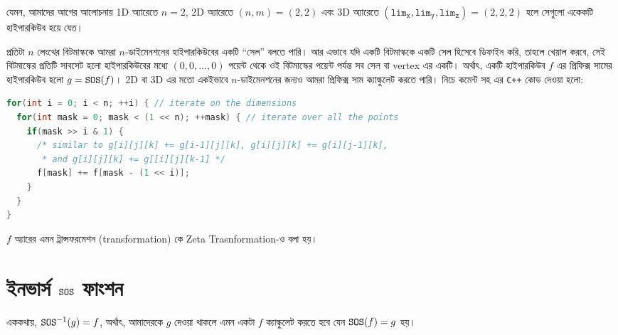 যেমন, আমাদের আগের আলোচনায় 1D অ্যারেতে $n=2$, 2D অ্যারেতে $(n,m) = (2,2)$ এবং
3D অ্যারেতে $(\mathtt{lim_x}, \mathtt{lim_y}, \mathtt{lim_z}) = (2,2,2)$ হলে
সেগুলো একেকটি হাইপারকিউব হয়ে যেত।

প্রতিটা $n$ লেংথের বিটমাস্ককে আমরা $n$-ডাইমেনশনের হাইপারকিউবের একটি ``সেল''
বলতে পারি। আর এভাবে যদি একটি বিটমাস্ককে একটি সেল হিসেবে ডিফাইন করি, তাহলে
খেয়াল করবে, সেই বিটমাস্কের প্রতিটি সাবসেট হলো হাইপারকিউবের মধ্যে $(0, 0,
\ldots, 0)$ পয়েন্ট থেকে ওই বিটমাস্কের পয়েন্ট পর্যন্ত সব সেল বা vertex এর
একটি। অর্থাৎ, একটি হাইপারকিউব $f$ এর প্রিফিক্স সামের হাইপারকিউব হলো $g =
\texttt{SOS}(f)$। 2D বা 3D এর মতো একইভাবে $n$-ডাইমেনশনের জন্যও আমরা প্রিফিক্স সাম
ক্যাল্কুলেট করতে পারি। নিচে কমেন্ট সহ এর \texttt{C++} কোড দেওয়া হলো:
\begin{lstlisting}[language=C++]
for(int i = 0; i < n; ++i) { // iterate on the dimensions
  for(int mask = 0; mask < (1 << n); ++mask) { // iterate over all the points
    if(mask >> i & 1) {
      /* similar to g[i][j][k] += g[i-1][j][k], g[i][j][k] += g[i][j-1][k],
       * and g[i][j][k] += g[[i][j][k-1] */
      f[mask] += f[mask - (1 << i)];
    }
  }
}
\end{lstlisting}
$f$ অ্যারের এমন ট্রান্সফরমেশন (transformation) কে Zeta Trasnformation-ও বলা
হয়।

\section{ইনভার্স \texorpdfstring{$\texttt{SOS}$}{SOS} ফাংশন}
এককথায়, $\texttt{SOS}^{-1}(g) = f$, অর্থাৎ, আমাদেরকে $g$ দেওয়া থাকলে এমন একটা $f$
ক্যাল্কুলেট করতে হবে যেন $\texttt{SOS}(f) = g$ হয়।

